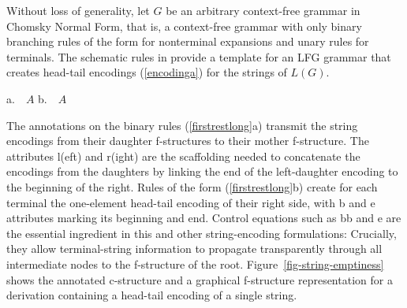 \documentclass[output=paper,hidelinks]{langscibook}
\begin{document}
\ea\label{encodinga}
\z

Without loss of generality, let  $G$ be an arbitrary context-free grammar in Chomsky Normal Form, that is, a context-free grammar with only binary branching rules of the form  for nonterminal expansions and unary rules  for terminals. The schematic rules in  provide a template for an LFG grammar  that creates head-tail encodings (\ref{encodinga}) for the strings of \mbox{$L(G)$}.

\ea\label{firstrestlong}
a.\ \ {\small  $A$ \rarrow {} 
                                       \hsp{-.75em} }
\hsp{2em}
b.\ \ {\small  $A$ \rarrow {}}
\z

\noindent The annotations on the binary rules (\ref{firstrestlong}a)  transmit the string encodings from their daughter f-structures to their mother f-structure. The attributes  \attr l(eft) and \attr r(ight) are the scaffolding needed to concatenate the encodings from the daughters by linking the end of the left-daughter encoding to the beginning of the right. Rules of the form (\ref{firstrestlong}b) create for each terminal the one-element head-tail encoding of their right side, with \attr b and \attr e attributes marking its beginning and end. Control equations such as \ducopy bb and  e are the essential ingredient in this and other string-encoding formulations: Crucially, they allow terminal-string information to propagate transparently through all intermediate nodes to the f-structure of the root. Figure~\ref{fig-string-emptiness} shows the annotated c-structure and a graphical f-structure representation for a derivation containing a head-tail encoding of a single string.
\end{document}
